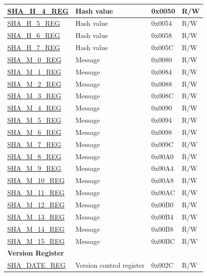 \begin{longtable}{ | l | l | l |l | }
\hyperref[regdesc:SHAHNREG]{SHA\_H\_4\_REG} & Hash value & 0x0050 & R/W \\ \hline
\hyperref[regdesc:SHAHNREG]{SHA\_H\_5\_REG} & Hash value & 0x0054 & R/W \\ \hline
\hyperref[regdesc:SHAHNREG]{SHA\_H\_6\_REG} & Hash value & 0x0058 & R/W \\ \hline
\hyperref[regdesc:SHAHNREG]{SHA\_H\_7\_REG} & Hash value & 0x005C & R/W \\ \hline
\hyperref[regdesc:SHAMNREG]{SHA\_M\_0\_REG} & Message & 0x0080 & R/W \\ \hline
\hyperref[regdesc:SHAMNREG]{SHA\_M\_1\_REG} & Message & 0x0084 & R/W \\ \hline
\hyperref[regdesc:SHAMNREG]{SHA\_M\_2\_REG} & Message & 0x0088 & R/W \\ \hline
\hyperref[regdesc:SHAMNREG]{SHA\_M\_3\_REG} & Message & 0x008C & R/W \\ \hline
\hyperref[regdesc:SHAMNREG]{SHA\_M\_4\_REG} & Message & 0x0090 & R/W \\ \hline
\hyperref[regdesc:SHAMNREG]{SHA\_M\_5\_REG} & Message & 0x0094 & R/W \\ \hline
\hyperref[regdesc:SHAMNREG]{SHA\_M\_6\_REG} & Message & 0x0098 & R/W \\ \hline
\hyperref[regdesc:SHAMNREG]{SHA\_M\_7\_REG} & Message & 0x009C & R/W \\ \hline
\hyperref[regdesc:SHAMNREG]{SHA\_M\_8\_REG} & Message & 0x00A0 & R/W \\ \hline
\hyperref[regdesc:SHAMNREG]{SHA\_M\_9\_REG} & Message & 0x00A4 & R/W \\ \hline
\hyperref[regdesc:SHAMNREG]{SHA\_M\_10\_REG} & Message & 0x00A8 & R/W \\ \hline
\hyperref[regdesc:SHAMNREG]{SHA\_M\_11\_REG} & Message & 0x00AC & R/W \\ \hline
\hyperref[regdesc:SHAMNREG]{SHA\_M\_12\_REG} & Message & 0x00B0 & R/W \\ \hline
\hyperref[regdesc:SHAMNREG]{SHA\_M\_13\_REG} & Message & 0x00B4 & R/W \\ \hline
\hyperref[regdesc:SHAMNREG]{SHA\_M\_14\_REG} & Message & 0x00B8 & R/W \\ \hline
\hyperref[regdesc:SHAMNREG]{SHA\_M\_15\_REG} & Message & 0x00BC & R/W \\ \hline
\multicolumn{4}{|l|}{\textbf{Version Register}} \\ \hline
\hyperref[regdesc:SHADATEREG]{SHA\_DATE\_REG} & Version control register & 0x002C & R/W \\ \hline
\end{longtable}

